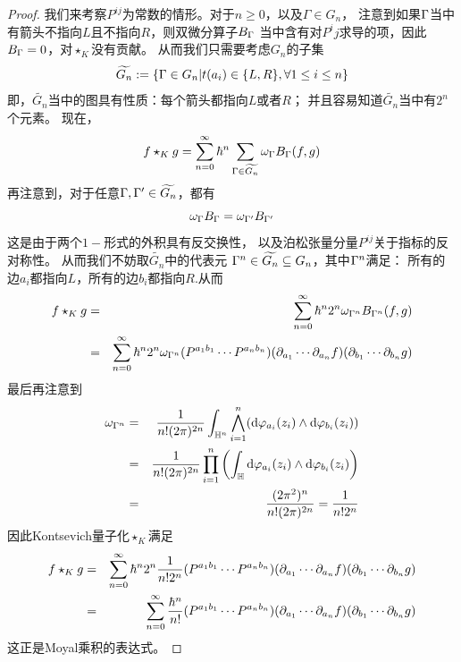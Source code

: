 \begin{proof}
我们来考察$P^{ij}$为常数的情形。对于$n\geq 0$，以及$\Gamma\in G_n$，
注意到如果$\Gamma$当中有箭头不指向$L$且不指向$R$，则双微分算子$B_\Gamma$
当中含有对$P^ij$求导的项，因此$B_\Gamma=0$，对$\star_K$没有贡献。
从而我们只需要考虑$G_n$的子集
$$\widetilde{G_n}:=\{\Gamma\in G_n|t(a_i)\in\{L,R\},\forall 1\leq i\leq n\}$$
即，$\widetilde{G_n}$当中的图具有性质：每个箭头都指向$L$或者$R$；
并且容易知道$\widetilde{G_n}$当中有$2^n$个元素。
现在，
$$
  f\star_K g=
  \sum_{n=0}^{\infty}
    \hbar^n
    \sum_{\Gamma\in\widetilde{G_n}}
      \omega_{\Gamma}B_{\Gamma}(f,g)
$$
再注意到，对于任意$\Gamma,\Gamma'\in\widetilde{G_n}$，都有
$$\omega_{\Gamma}B_{\Gamma}=\omega_{\Gamma'}B_{\Gamma'}$$
这是由于两个$1-$形式的外积具有反交换性，
以及泊松张量分量$P^{ij}$关于指标的反对称性。
从而我们不妨取$\widetilde{G_n}$中的代表元
$\Gamma^n\in\widetilde{G_n}\subseteq G_n$，其中$\Gamma^n$满足：
所有的边$a_i$都指向$L$，所有的边$b_i$都指向$R$.从而
\begin{eqnarray*}
  f\star_K g
&=&
  \sum_{n=0}^{\infty}
    \hbar^n
      2^n\omega_{\Gamma^n}B_{\Gamma^n}(f,g)\\
&=&
  \sum_{n=0}^{\infty}
    \hbar^n2^n
      \omega_{\Gamma^n}
      (P^{a_1b_1}\cdots P^{a_nb_n})
      (\partial_{a_1}\cdots\partial_{a_n}f)
      (\partial_{b_1}\cdots\partial_{b_n}g)
\end{eqnarray*}
最后再注意到
\begin{eqnarray*}
     \omega_{\Gamma^n}
&=&
     \frac{1}{n!(2\pi)^{2n}}
     \int_{\mathbb{H}^n}
       \bigwedge_{i=1}^n
         (
         \mathrm{d}\varphi_{a_i}(z_i)\wedge
         \mathrm{d}\varphi_{b_i}(z_i)
         )\\
&=&
     \frac{1}{n!(2\pi)^{2n}}
     \prod_{i=1}^n
       \left(
         \int_{\mathbb{H}}
           \mathrm{d}\varphi_{a_i}(z_i)\wedge
           \mathrm{d}\varphi_{b_i}(z_i)
       \right)\\
&=&
     \frac{(2\pi^2)^n}{n!(2\pi)^{2n}}
 =
     \frac{1}{n!2^n}
\end{eqnarray*}
因此Kontsevich量子化$\star_K$满足
\begin{eqnarray*}
  f\star_K g
&=&
  \sum_{n=0}^{\infty}
    \hbar^n2^n
      \frac{1}{n!2^n}
      (P^{a_1b_1}\cdots P^{a_nb_n})
      (\partial_{a_1}\cdots\partial_{a_n}f)
      (\partial_{b_1}\cdots\partial_{b_n}g)\\
&=&
     \sum_{n=0}^{\infty}
      \frac{\hbar^n}{n!}
      (P^{a_1b_1}\cdots P^{a_nb_n})
      (\partial_{a_1}\cdots\partial_{a_n}f)
      (\partial_{b_1}\cdots\partial_{b_n}g)\\
\end{eqnarray*}
这正是Moyal乘积的表达式。
\end{proof}

